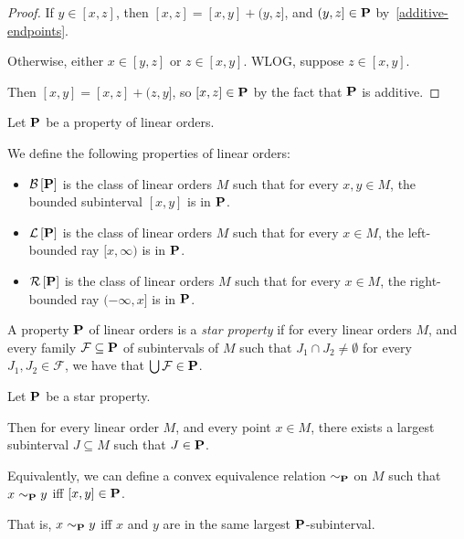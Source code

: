 \begin{proof}
  If $y \in [x, z]$, then $[x, z] = [x, y] + (y, z]$,
  and $(y, z] \in \mathbf{P}$ by~\cref{additive-endpoints}.

  Otherwise, either $x \in [y, z]$ or $z \in [x, y]$.
  WLOG, suppose $z \in [x, y]$.

  Then $[x, y] = [x, z] + (z, y]$,
  so $[x, z] \in \mathbf{P}$ by the fact that $\mathbf{P}$ is additive.
\end{proof}

\begin{definitions}
  Let $\mathbf{P}$ be a property of linear orders.

  We define the following properties of linear orders:
  \begin{itemize}
    \item $\mathcal{B} \left[ {{\mathbf{P}}} \right]$ is the class of linear orders $M$ such that for every $x, y \in M$,
          the bounded subinterval $[x, y]$ is in $\mathbf{P}$.
    \item $\mathcal{L} \left[ {{\mathbf{P}}} \right]$ is the class of linear orders $M$ such that for every $x \in M$,
          the left-bounded ray $[x, \infty)$ is in $\mathbf{P}$.
    \item $\mathcal{R} \left[ {{\mathbf{P}}} \right]$ is the class of linear orders $M$ such that for every $x \in M$,
          the right-bounded ray $(-\infty, x]$ is in $\mathbf{P}$.
  \end{itemize}
\end{definitions}

\begin{definition}
  A property $\mathbf{P}$ of linear orders is a \emph{star property} if
  for every linear orders $M$, and every family $\mathcal{F} \subseteq \mathbf{P}$
  of subintervals of $M$ such that $J_1 \cap J_2 \ne \emptyset$
  for every $J_1, J_2 \in \mathcal{F}$, we have that
  $\bigcup \mathcal{F} \in \mathbf{P}$.
\end{definition}

\begin{lemma}
  Let $\mathbf{P}$ be a star property.

  Then for every linear order $M$,
  and every point $x \in M$, there exists a largest subinterval $J \subseteq M$ such that
  $J \in \mathbf{P}$.

  Equivalently, we can define a convex equivalence relation $\sim_{\mathbf{P}}$ on $M$ such that $x \sim_{\mathbf{P}} y$ iff $[x, y] \in \mathbf{P}$.

  That is,
  $x \sim_{\mathbf{P}} y$ iff $x$ and $y$ are in the same largest $\mathbf{P}$-subinterval.

\end{lemma}

